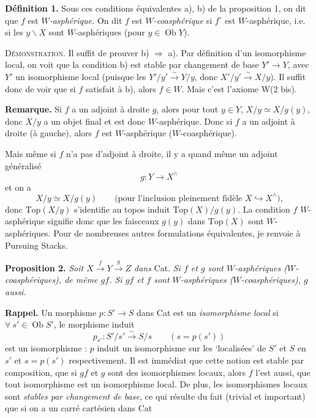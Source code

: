 \documentclass[11pt]{article}
\newcommand{\printedpage}[1]{\marginpar{\footnotesize p.~#1}}
\newcommand{\msp}[1]{\marginpar{\footnotesize [#1]}}
\newcommand{\Ob}{\operatorname{Ob}}
\begin{document}
\msp{page 23}\textbf{Définition 1.} Sous ces conditions équivalentes a), b) de la proposition 1, on dit que $f$ est \textit{$W$-asphérique.} On dit $f$ est \textit{$W$-coasphérique} si $f^{\circ}$ est $W$-asphérique, i.e. si les $y\backslash X$ sont $W$-asphériques (pour $y \in \Ob Y$).

\textsc{Démonstration.} Il suffit de prouver b) $\Longrightarrow$ a). Par définition d'un isomorphisme local, on voit que la condition b) est stable par changement de base $Y' \longrightarrow Y$, avec $Y'$ un isomorphisme local (puisque les $Y'/y' \xrightarrow{\sim} Y/y$, donc $X'/y' \xrightarrow{\sim} X/y$). Il suffit donc de voir que si $f$ satisfait à b), alors $f \in W$. Mais c'est l'axiome W(2 bis).

\begin{center}
\end{center}

\printedpage{20}

\textbf{Remarque.} Si $f$ a un adjoint à droite $g$, alors pour tout $y \in Y$, $X/y \simeq X/g(y)$, donc $X/y$ a un objet final et est donc $W$-asphérique. Donc si $f$ a un adjoint à droite (à gauche), alors $f$ est $W$-asphérique ($W$-coasphérique).

Mais même si $f$ n'a pas d'adjoint à droite, il y a quand même un adjoint généralisé
\[
g : Y \longrightarrow X^{\wedge}
\]
et on a
\[
X/y \simeq X/g(y) \qquad \text{(pour l'inclusion pleinement fidèle $X \hookrightarrow X^{\wedge}$),}
\]
donc $\mathrm{Top}(X/y)$ s'identifie au topos induit $\mathrm{Top}(X)/g(y)$. La condition $f$ $W$-asphérique signifie donc que les faisceaux $g(y)$ dans $\mathrm{Top}(X)$ sont
\msp{page 24}
$W$-asphériques. Pour de nombreuses autres formulations équivalentes, je renvoie à Pursuing Stacks.

\textbf{Proposition 2.} \textit{Soit $X \xrightarrow{f} Y \xrightarrow{g} Z$ dans} \textup{Cat}. \textit{Si $f$ et $g$ sont $W$-asphériques ($W$-coasphériques), de même $gf$. Si $gf$ et $f$ sont $W$-asphériques ($W$-coasphériques), $g$ aussi.}

\textbf{Rappel.} Un morphisme $p : S' \longrightarrow S$ dans Cat est un \textit{isomorphisme local} si $\forall\ s' \in \Ob S'$, le morphisme induit
\[
p_{s'} : S'/s' \xrightarrow{\sim} S/s \qquad (s = p(s'))
\]
est un isomorphisme : $p$ induit un isomorphisme sur les ‘localisées’ de $S'$ et $S$ en $s'$ et $s = p(s')$ respectivement. Il est immédiat que cette notion est stable par composition, que si $gf$ et $g$ sont des isomorphismes locaux, alors $f$ l'est aussi, que tout isomorphisme est un isomorphisme local. De plus, les isomorphismes locaux sont \textit{stables par changement de base,} ce qui résulte du fait (trivial et important) que si on a un carré cartésien dans Cat
\end{document}
